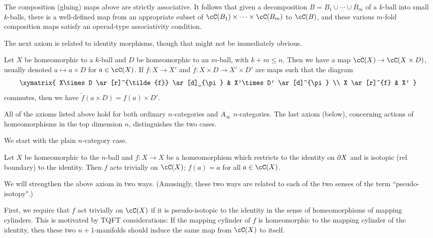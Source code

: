 {The composition (gluing) maps above are strictly associative.
It follows that given a decomposition $B = B_1\cup\cdots\cup B_m$ of a $k$-ball
into small $k$-balls, there is a well-defined
map from an appropriate subset of $\cC(B_1)\times\cdots\times\cC(B_m)$ to $\cC(B)$,
and these various $m$-fold composition maps satisfy an
operad-type associativity condition.}


The next axiom is related to identity morphisms, though that might not be immediately obvious.

{Let $X$ be homeomorphic to a $k$-ball and $D$ be homeomorphic to an $m$-ball, with $k+m \le n$.
Then we have a map $\cC(X)\to \cC(X\times D)$, usually denoted $a\mapsto a\times D$ for $a\in \cC(X)$.
If $f:X\to X'$ and $\tilde{f}:X\times D \to X'\times D'$ are maps such that the diagram
\[ \xymatrix{
	X\times D \ar[r]^{\tilde{f}} \ar[d]_{\pi} & X'\times D' \ar[d]^{\pi} \\
	X \ar[r]^{f} & X'
} \]
commutes, then we have $\tilde{f}(a\times D) = f(a)\times D'$.}


All of the axioms listed above hold for both ordinary $n$-categories and $A_\infty$ $n$-categories.
The last axiom (below), concerning actions of 
homeomorphisms in the top dimension $n$, distinguishes the two cases.

We start with the plain $n$-category case.

{Let $X$ be homeomorphic to the $n$-ball and $f: X\to X$ be a homeomorphism which restricts
to the identity on $\partial X$ and is isotopic (rel boundary) to the identity.
Then $f$ acts trivially on $\cC(X)$; $f(a) = a$ for all $a\in \cC(X)$.}

We will strengthen the above axiom in two ways.
(Amusingly, these two ways are related to each of the two senses of the term
``pseudo-isotopy".)

First, we require that $f$ act trivially on $\cC(X)$ if it is pseudo-isotopic to the identity
in the sense of homeomorphisms of mapping cylinders.
This is motivated by TQFT considerations:
If the mapping cylinder of $f$ is homeomorphic to the mapping cylinder of the identity,
then these two $n{+}1$-manifolds should induce the same map from $\cC(X)$ to itself.


